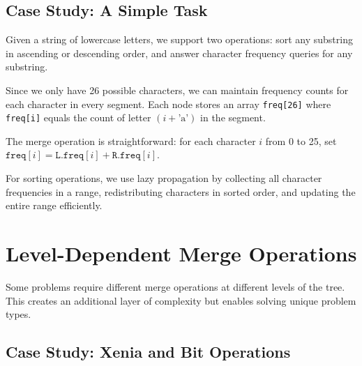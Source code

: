 \subsection{Case Study: A Simple Task}



Given a string of lowercase letters, we support two operations: sort any substring in ascending or descending order, and answer character frequency queries for any substring.

Since we only have 26 possible characters, we can maintain frequency counts for each character in every segment. Each node stores an array \texttt{freq[26]} where \texttt{freq[i]} equals the count of letter $(i + \text{'a'})$ in the segment.

The merge operation is straightforward: for each character $i$ from 0 to 25, set $\texttt{freq}[i] = \texttt{L.freq}[i] + \texttt{R.freq}[i]$.

For sorting operations, we use lazy propagation by collecting all character frequencies in a range, redistributing characters in sorted order, and updating the entire range efficiently.


\section{Level-Dependent Merge Operations}

Some problems require different merge operations at different levels of the tree. This creates an additional layer of complexity but enables solving unique problem types.

\subsection{Case Study: Xenia and Bit Operations}

